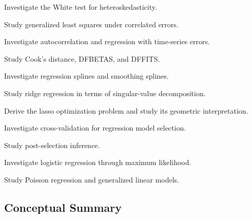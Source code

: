 \begin{exercise}[4]
Investigate the White test for heteroskedasticity.
\end{exercise}

\begin{exercise}[4]
Study generalized least squares under correlated errors.
\end{exercise}

\begin{exercise}[4]
Investigate autocorrelation and regression with time-series errors.
\end{exercise}

\begin{exercise}[4]
Study Cook's distance, DFBETAS, and DFFITS.
\end{exercise}

\begin{exercise}[4]
Investigate regression splines and smoothing splines.
\end{exercise}

\begin{exercise}[4]
Study ridge regression in terms of singular-value decomposition.
\end{exercise}

\begin{exercise}[4]
Derive the lasso optimization problem and study its geometric
interpretation.
\end{exercise}

\begin{exercise}[4]
Investigate cross-validation for regression model selection.
\end{exercise}

\begin{exercise}[4]
Study post-selection inference.
\end{exercise}

\begin{exercise}[4]
Investigate logistic regression through maximum likelihood.
\end{exercise}

\begin{exercise}[4]
Study Poisson regression and generalized linear models.
\end{exercise}

\subsection{Conceptual Summary}
\label{subsec:regression-summary}

